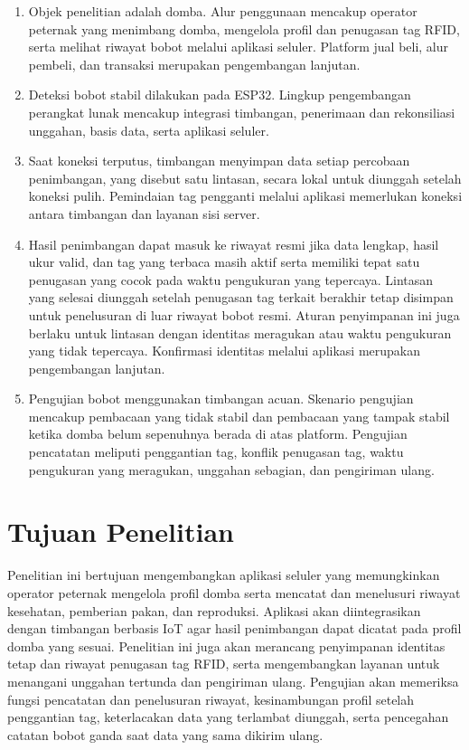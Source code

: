 \begin{enumerate}
  \item Objek penelitian adalah domba. Alur penggunaan mencakup {\setlength{\fboxsep}{1pt}\colorbox{revisilama}{operator}} {\setlength{\fboxsep}{1pt}\colorbox{revisibaru}{peternak}} yang
        menimbang domba, mengelola profil dan penugasan tag RFID, serta melihat
        riwayat bobot melalui aplikasi seluler. Platform jual beli, alur pembeli,
        dan transaksi merupakan pengembangan lanjutan.
  \item Deteksi bobot stabil dilakukan pada ESP32. Lingkup pengembangan
        perangkat lunak mencakup integrasi timbangan, penerimaan dan rekonsiliasi
        unggahan, basis data, serta aplikasi seluler.
  \item Saat koneksi terputus, timbangan menyimpan data setiap percobaan
        penimbangan, yang disebut satu lintasan, secara lokal untuk diunggah
        setelah koneksi pulih. Pemindaian tag pengganti melalui aplikasi
        memerlukan koneksi antara timbangan dan layanan sisi server.
  \item Hasil penimbangan dapat masuk ke riwayat resmi jika data lengkap, hasil
        ukur valid, dan tag yang terbaca masih aktif serta memiliki tepat satu
        penugasan yang cocok pada waktu pengukuran yang tepercaya. Lintasan
        yang selesai diunggah setelah penugasan tag terkait berakhir tetap
        disimpan untuk penelusuran di luar riwayat bobot resmi. Aturan
        penyimpanan ini juga berlaku untuk lintasan dengan identitas meragukan
        atau waktu pengukuran yang tidak tepercaya. Konfirmasi identitas melalui
        aplikasi merupakan pengembangan lanjutan.
  \item Pengujian bobot menggunakan timbangan acuan. Skenario pengujian
        mencakup pembacaan yang tidak stabil dan pembacaan yang tampak stabil
        ketika domba belum sepenuhnya berada di atas platform. Pengujian pencatatan
        meliputi penggantian tag, konflik penugasan tag, waktu pengukuran yang
        meragukan, unggahan sebagian, dan pengiriman ulang.
\end{enumerate}

\section{Tujuan Penelitian}

Penelitian ini bertujuan mengembangkan aplikasi seluler yang memungkinkan
{\setlength{\fboxsep}{1pt}\colorbox{revisilama}{operator}} {\setlength{\fboxsep}{1pt}\colorbox{revisibaru}{peternak}} mengelola profil domba serta mencatat dan menelusuri riwayat
kesehatan, pemberian pakan, dan reproduksi. Aplikasi akan diintegrasikan
dengan timbangan berbasis IoT agar hasil penimbangan dapat dicatat pada
profil domba yang sesuai. Penelitian ini juga akan merancang penyimpanan
identitas tetap dan riwayat penugasan tag RFID, serta mengembangkan layanan
untuk menangani unggahan tertunda dan pengiriman ulang. Pengujian akan
memeriksa fungsi pencatatan dan penelusuran riwayat, kesinambungan profil
setelah penggantian tag, keterlacakan data yang terlambat diunggah, serta
pencegahan catatan bobot ganda saat data yang sama dikirim ulang.

